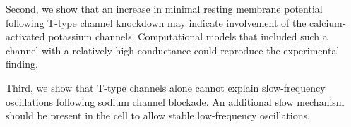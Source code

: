 \documentclass[../main.tex]{subfiles}
\begin{document}
Second, we show that an increase in minimal resting membrane potential following T-type channel knockdown may indicate involvement of the calcium-activated potassium channels. Computational models that included such a channel with a relatively high conductance could reproduce the experimental finding.

Third, we show that T-type channels alone cannot explain slow-frequency oscillations following sodium channel blockade. An additional slow mechanism should be present in the cell to allow stable low-frequency oscillations.
\end{document}
